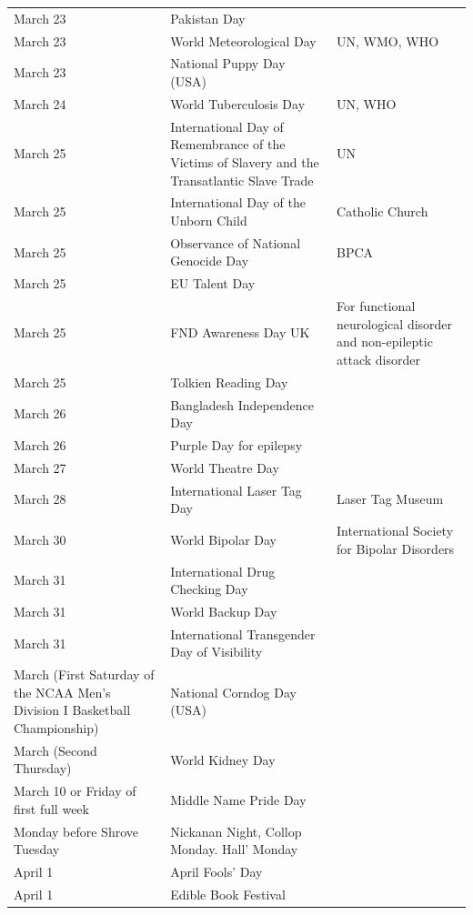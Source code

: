 \documentclass[
  openany]{book}
\begin{document}
\begin{longtable}[t]{>{\raggedright\arraybackslash}p{8em}>{\raggedright\arraybackslash}p{18em}>{\raggedright\arraybackslash}p{10em}}
\rowcolor{gray!6}  March 23 & Pakistan Day & \\
March 23 & World Meteorological Day & UN, WMO, WHO\\
\rowcolor{gray!6}  March 23 & National Puppy Day (USA) & \\
\addlinespace
March 24 & World Tuberculosis Day & UN, WHO\\
\rowcolor{gray!6}  March 25 & International Day of Remembrance of the Victims of Slavery and the Transatlantic Slave Trade & UN\\
March 25 & International Day of the Unborn Child & Catholic Church\\
\rowcolor{gray!6}  March 25 & Observance of National Genocide Day & BPCA\\
March 25 & EU Talent Day & \\
\addlinespace
\rowcolor{gray!6}  March 25 & FND Awareness Day UK & For functional neurological disorder and non-epileptic attack disorder\\
March 25 & Tolkien Reading Day & \\
\rowcolor{gray!6}  March 26 & Bangladesh Independence Day & \\
March 26 & Purple Day for epilepsy & \\
\rowcolor{gray!6}  March 27 & World Theatre Day & \\
\addlinespace
March 28 & International Laser Tag Day & Laser Tag Museum\\
\rowcolor{gray!6}  March 30 & World Bipolar Day & International Society for Bipolar Disorders\\
March 31 & International Drug Checking Day & \\
\rowcolor{gray!6}  March 31 & World Backup Day & \\
March 31 & International Transgender Day of Visibility & \\
\addlinespace
\rowcolor{gray!6}  March (First Saturday of the NCAA Men's Division I Basketball Championship) & National Corndog Day (USA) & \\
March (Second Thursday) & World Kidney Day & \\
\rowcolor{gray!6}  March 10 or Friday of first full week & Middle Name Pride Day & \\
Monday before Shrove Tuesday & Nickanan Night, Collop Monday. Hall' Monday & \\
\rowcolor{gray!6}  April 1 & April Fools' Day & \\
\addlinespace
April 1 & Edible Book Festival & \\

\end{longtable}
\end{document}
